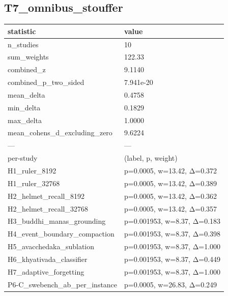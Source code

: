 \subsection*{T7\_omnibus\_stouffer}
{\def\LTcaptype{none} %
\begin{longtable}[]{@{}ll@{}}
\toprule\noalign{}
statistic & value \\
\midrule\noalign{}
\endhead
\bottomrule\noalign{}
\endlastfoot
n\_studies & 10 \\
sum\_weights & 122.33 \\
combined\_z & 9.1140 \\
combined\_p\_two\_sided & 7.941e-20 \\
mean\_delta & 0.4758 \\
min\_delta & 0.1829 \\
max\_delta & 1.0000 \\
mean\_cohens\_d\_excluding\_zero & 9.6224 \\
--- & --- \\
per-study & (label, p, weight) \\
H1\_ruler\_8192 & p=0.0005, w=13.42, Δ=0.372 \\
H1\_ruler\_32768 & p=0.0005, w=13.42, Δ=0.389 \\
H2\_helmet\_recall\_8192 & p=0.0005, w=13.42, Δ=0.362 \\
H2\_helmet\_recall\_32768 & p=0.0005, w=13.42, Δ=0.357 \\
H3\_buddhi\_manas\_grounding & p=0.001953, w=8.37, Δ=0.183 \\
H4\_event\_boundary\_compaction & p=0.001953, w=8.37, Δ=0.398 \\
H5\_avacchedaka\_sublation & p=0.001953, w=8.37, Δ=1.000 \\
H6\_khyativada\_classifier & p=0.001953, w=8.37, Δ=0.449 \\
H7\_adaptive\_forgetting & p=0.001953, w=8.37, Δ=1.000 \\
P6-C\_swebench\_ab\_per\_instance & p=0.0005, w=26.83, Δ=0.249 \\
\end{longtable}
}

